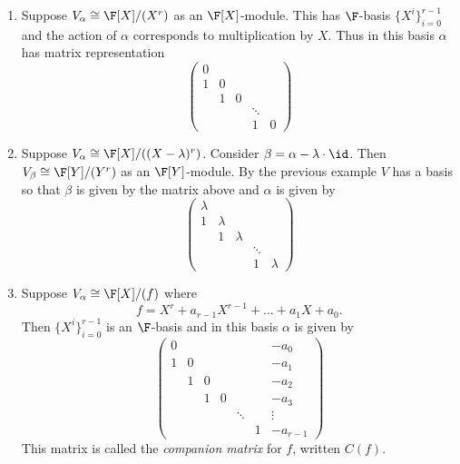 \documentclass[a4paper]{article}
\theoremstyle{definition}
\begin{document}
\begin{eg}\leavevmode
  \begin{enumerate}
  \item Suppose \(V_\alpha \cong \F[X]/(X^r)\) as an \(\F[X]\)-module. This has \(\F\)-basis \(\{X^i\}_{i = 0}^{r - 1}\) and the action of \(\alpha\) corresponds to multiplication by \(X\). Thus in this basis \(\alpha\) has matrix representation
    \[
      \begin{pmatrix}
        0 \\
        1 & 0 \\
        & 1 & 0 \\
        & & & \ddots \\
        & & & 1 & 0
      \end{pmatrix}
    \]
  \item Suppose \(V_\alpha \cong \F[X]/((X - \lambda)^r)\). Consider \(\beta = \alpha - \lambda \cdot \id\). Then \(V_\beta \cong \F[Y]/(Y^r)\) as an \(\F[Y]\)-module. By the previous example \(V\) has a basis so that \(\beta\) is given by the matrix above and \(\alpha\) is given by
    \[
      \begin{pmatrix}
        \lambda \\
        1 & \lambda \\
        & 1 & \lambda \\
        & & & \ddots \\
        & & & 1 & \lambda
      \end{pmatrix}
    \]
  \item Suppose \(V_\alpha \cong \F[X]/(f)\) where
    \[
      f = X^r + a_{r - 1}X^{r - 1} + \dots + a_1X + a_0.
    \]
    Then \(\{X^i\}_{i = 0}^{r - 1}\) is an \(\F\)-basis and in this basis \(\alpha\) is given by
    \[
      \begin{pmatrix}
        0 & & & & & & -a_0 \\
        1 & 0 & & & & & -a_1 \\
        & 1 & 0 & & & & -a_2 \\
        & & 1 & 0 & & & -a_3 \\
        & & & & \ddots & & \vdots \\
        & & & & & 1 & -a_{r - 1}
      \end{pmatrix}
    \]
    This matrix is called the \emph{companion matrix} for \(f\), written \(C(f)\).
  \end{enumerate}
\end{eg}
\end{document}
